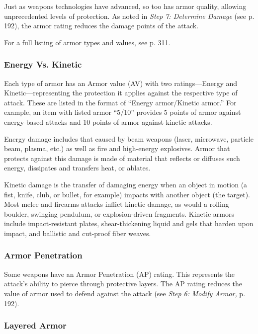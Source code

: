 Just as weapons technologies have advanced, so too 
has armor quality, allowing unprecedented levels of 
protection. As noted in \textit{Step 7: Determine Damage}
(see p. 192), the armor rating reduces the damage 
points of the attack.

For a full listing of armor types and values, see p. 311.

\subsubsection{Energy Vs. Kinetic}

Each type of armor has an Armor value (AV) with 
two ratings—Energy and Kinetic—representing 
the protection it applies against the respective type 
of attack. These are listed in the format of ``Energy 
armor/Kinetic armor.'' For example, an item with 
listed armor ``5/10'' provides 5 points of armor against 
energy-based attacks and 10 points of armor against 
kinetic attacks.

Energy damage includes that caused by beam weapons
(laser, microwave, particle beam, plasma, etc.) as
well as fire and high-energy explosives. Armor that 
protects against this damage is made of material that 
reflects or diffuses such energy, dissipates and transfers
heat, or ablates.

Kinetic damage is the transfer of damaging energy 
when an object in motion (a fist, knife, club, or bullet, 
for example) impacts with another object (the target). 
Most melee and firearms attacks inflict kinetic damage, 
as would a rolling boulder, swinging pendulum, or 
explosion-driven fragments. Kinetic armors include 
impact-resistant plates, shear-thickening liquid and 
gels that harden upon impact, and ballistic and cut-proof
fiber weaves.

\subsubsection{Armor Penetration}

Some weapons have an Armor Penetration (AP) rating. 
This represents the attack's ability to pierce through 
protective layers. The AP rating reduces the value of 
armor used to defend against the attack (see \textit{Step 6: }
\textit{Modify Armor,} p. 192).

\subsubsection{Layered Armor}

